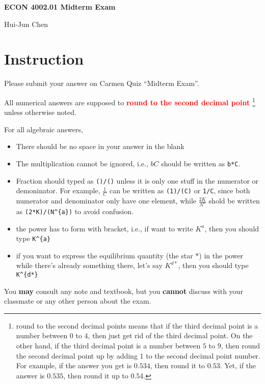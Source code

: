 \documentclass[14pt]{extarticle}
\newcommand{\red}[1]{\textcolor{red}{#1}}
\newcommand{\showAns}{\setboolean{showAns}{true}}
\begin{document}
\centerline{\huge\bf ECON 4002.01 Midterm Exam}
\smallskip
\centerline{\LARGE Hui-Jun Chen}

\medskip


\section*{Instruction}
\label{sec:Instruction}
Please submit your answer on Carmen Quiz ``Midterm Exam''.

All numerical answers are supposed to \red{\textbf{round to the second decimal point}}%
\footnote{round to the second decimal points means that if the third decimal point is a number between $ 0 $ to $ 4 $, then just get rid of the third decimal point. On the other hand, if the third decimal point is a number between $ 5 $ to $ 9 $, then round the second decimal point up by adding $ 1 $ to the second decimal point number. For example, if the answer you get is $ 0.534 $, then round it to $ 0.53 $. Yet, if the answer is $ 0.535 $, then round it up to $ 0.54 $.}
unless otherwise noted.

For all algebraic answers,
\begin{itemize}
    \item There should be no space in your answer in the blank
    \item The multiplication cannot be ignored, i.e., $ bC $ should be written as \verb|b*C|.
    \item Fraction should typed as \verb|()/()| unless it is only one stuff in the numerator or demoninator.
            For example, $ \frac{1}{C} $ can be written as \verb|(1)/(C)| or \verb|1/C|, since both numerator and denominator only have one element, while $ \frac{2K}{N^{a}} $ shold be written as \verb|(2*K)/(N^{a})| to avoid confusion.
    \item the power has to form with bracket, i.e., if want to write $ K^{a} $, then you should type \verb|K^{a}|
    \item if you want to express the equilibrium quantity (the star $ * $) in the power while there's already something there, let's say $ K^{d*} $, then you should type \verb|K^{d*}|
\end{itemize}

You \textbf{may} consult any note and textbook, but you \textbf{cannot} discuss with your classmate or any other person about the exam.
\end{document}
